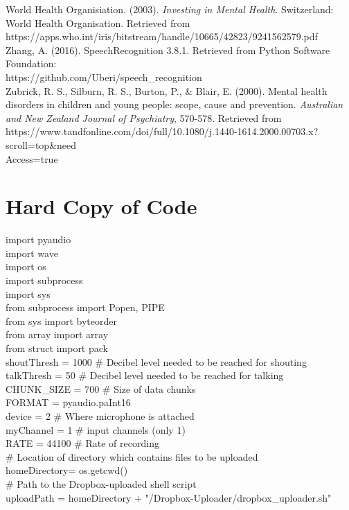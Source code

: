 \documentclass[a4paper,11pt]{report}
\begin{document}
World Health Organisiation. (2003). \textit{Investing in Mental Health}. Switzerland: World Health Organisation. Retrieved from https://apps.who.int/iris/bitstream/handle/10665/42823/9241562579.pdf\\

Zhang, A. (2016). {SpeechRecognition 3.8.1}. Retrieved from Python Software Foundation: \\https://github.com/Uberi/speech\_recognition\\

Zubrick, R. S., Silburn, R. S., Burton, P., \& Blair, E. (2000). Mental health disorders in children and young people: scope, cause and prevention. \textit{Australian and New Zealand Journal of Psychiatry}, 570-578. Retrieved from https://www.tandfonline.com/doi/full/10.1080/j.1440-1614.2000.00703.x?scroll=top\&need\\Access=true\\


\chapter{Hard Copy of Code}

import pyaudio\\
import wave\\
import os\\
import subprocess\\
import sys\\

from subprocess import Popen, PIPE\\
from sys import byteorder\\
from array import array\\
from struct import pack\\

shoutThresh = 1000          \# Decibel level needed to be reached for shouting\\
talkThresh = 50             \# Decibel level needed to be reached for talking\\
CHUNK\_SIZE = 700            \# Size of data chunks\\
FORMAT = pyaudio.paInt16\\    
device = 2                  \# Where microphone is attached\\
myChannel = 1               \# input channels (only 1)\\
RATE = 44100                \# Rate of recording\\

\# Location of directory which contains files to be uploaded\\
homeDirectory= os.getcwd()\\
\# Path to the Dropbox-uploaded shell script\\
uploadPath = homeDirectory + "/Dropbox-Uploader/dropbox\_uploader.sh"\\
\end{document}

